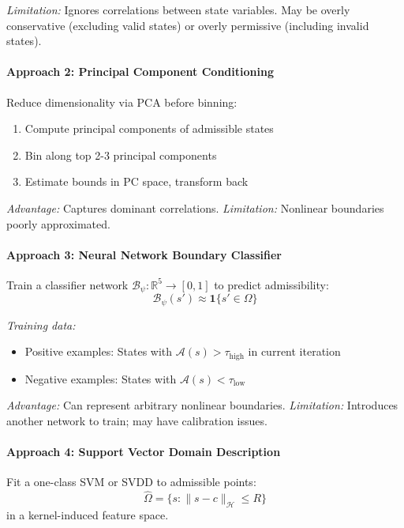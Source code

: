\textit{Limitation:} Ignores correlations between state variables. May be overly conservative (excluding valid states) or overly permissive (including invalid states).

\paragraph{Approach 2: Principal Component Conditioning}

Reduce dimensionality via PCA before binning:
\begin{enumerate}
    \item Compute principal components of admissible states
    \item Bin along top 2-3 principal components
    \item Estimate bounds in PC space, transform back
\end{enumerate}

\textit{Advantage:} Captures dominant correlations.
\textit{Limitation:} Nonlinear boundaries poorly approximated.

\paragraph{Approach 3: Neural Network Boundary Classifier}

Train a classifier network $\mathcal{B}_\psi: \mathbb{R}^5 \to [0, 1]$ to predict admissibility:
\begin{equation}
    \mathcal{B}_\psi(s') \approx \mathbf{1}\{s' \in \Omega\}
\end{equation}

\textit{Training data:}
\begin{itemize}
    \item Positive examples: States with $\mathcal{A}(s) > \tau_{\text{high}}$ in current iteration
    \item Negative examples: States with $\mathcal{A}(s) < \tau_{\text{low}}$
\end{itemize}

\textit{Advantage:} Can represent arbitrary nonlinear boundaries.
\textit{Limitation:} Introduces another network to train; may have calibration issues.

\paragraph{Approach 4: Support Vector Domain Description}

Fit a one-class SVM or SVDD to admissible points:
\begin{equation}
    \hat{\Omega} = \{s : \|s - c\|_{\mathcal{H}} \leq R\}
\end{equation}
in a kernel-induced feature space.

